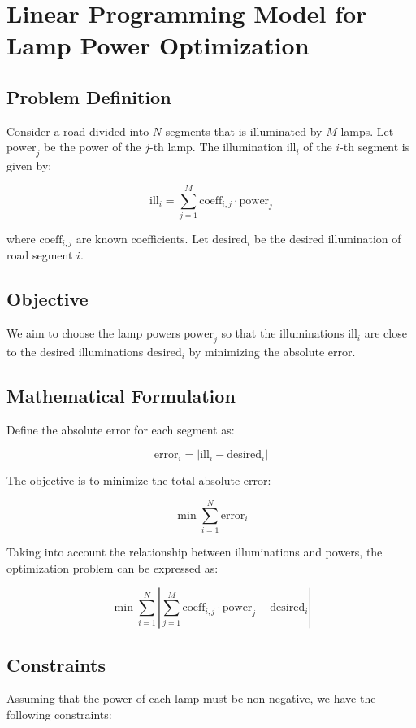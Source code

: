 \documentclass{article}
\begin{document}
\section*{Linear Programming Model for Lamp Power Optimization}

\subsection*{Problem Definition}
Consider a road divided into \( N \) segments that is illuminated by \( M \) lamps. Let \( \text{power}_j \) be the power of the \( j \)-th lamp. The illumination \( \text{ill}_i \) of the \( i \)-th segment is given by:

\[
\text{ill}_i = \sum_{j=1}^{M} \text{coeff}_{i,j} \cdot \text{power}_j
\]

where \( \text{coeff}_{i,j} \) are known coefficients. Let \( \text{desired}_i \) be the desired illumination of road segment \( i \).

\subsection*{Objective}
We aim to choose the lamp powers \( \text{power}_j \) so that the illuminations \( \text{ill}_i \) are close to the desired illuminations \( \text{desired}_i \) by minimizing the absolute error.

\subsection*{Mathematical Formulation}
Define the absolute error for each segment as:

\[
\text{error}_i = |\text{ill}_i - \text{desired}_i|
\]

The objective is to minimize the total absolute error:

\[
\min \sum_{i=1}^{N} \text{error}_i
\]

Taking into account the relationship between illuminations and powers, the optimization problem can be expressed as:

\[
\min \sum_{i=1}^{N} \left| \sum_{j=1}^{M} \text{coeff}_{i,j} \cdot \text{power}_j - \text{desired}_i \right|
\]

\subsection*{Constraints}
Assuming that the power of each lamp must be non-negative, we have the following constraints:
\end{document}
